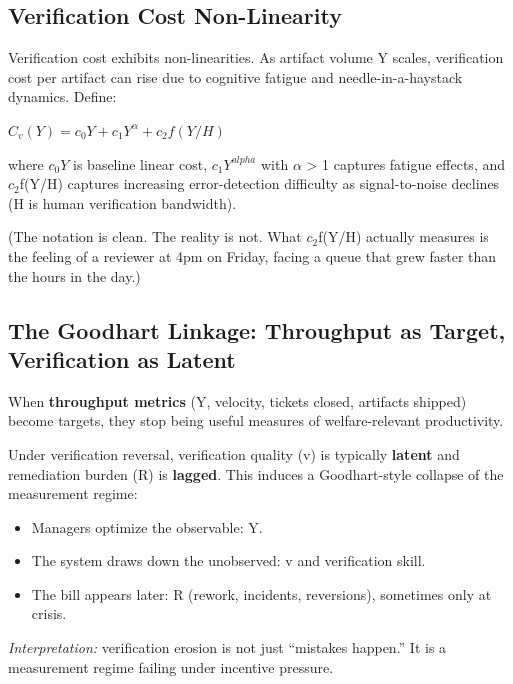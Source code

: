 \documentclass[11pt,a4paper]{article}
\providecommand{\tightlist}{\setlength{\itemsep}{0pt}\setlength{\parskip}{0pt}}
\begin{document}
\hypertarget{verification-cost-non-linearity}{%
\subsection{ Verification Cost Non-Linearity}\label{verification-cost-non-linearity}}

Verification cost exhibits non-linearities. As artifact volume Y scales, verification cost per artifact can rise due to cognitive fatigue and needle-in-a-haystack dynamics. Define:

$C_v(Y) = c_0Y + c_1Y^\alpha + c_2f(Y/H)$

where $c_0 Y$ is baseline linear cost, $c_1 Y^{alpha}$ with $\alpha$ > 1 captures fatigue effects, and $c_2$f(Y/H) captures increasing error-detection difficulty as signal-to-noise declines (H is human verification bandwidth).

(The notation is clean. The reality is not. What $c_2$f(Y/H) actually measures is the feeling of a reviewer at 4pm on Friday, facing a queue that grew faster than the hours in the day.)

\hypertarget{the-goodhart-linkage-throughput-as-target-verification-as-latent}{%
\subsection{ The Goodhart Linkage: Throughput as Target, Verification as Latent}\label{the-goodhart-linkage-throughput-as-target-verification-as-latent}}

When \textbf{throughput metrics} (Y, velocity, tickets closed, artifacts shipped) become targets, they stop being useful measures of welfare-relevant productivity.

Under verification reversal, verification quality (v) is typically \textbf{latent} and remediation burden (R) is \textbf{lagged}. This induces a Goodhart-style collapse of the measurement regime:

\begin{itemize}
\tightlist
\item
  Managers optimize the observable: Y.
\item
  The system draws down the unobserved: v and verification skill.
\item
  The bill appears later: R (rework, incidents, reversions), sometimes only at crisis.
\end{itemize}

\emph{Interpretation:} verification erosion is not just ``mistakes happen.'' It is a measurement regime failing under incentive pressure.
\end{document}
